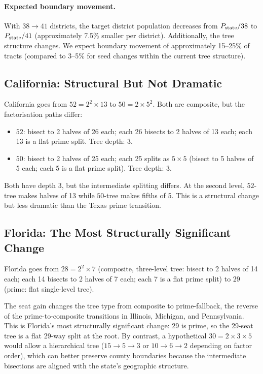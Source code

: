 \paragraph{Expected boundary movement.}
With $38 \to 41$ districts, the target district population decreases
from $P_{\rm state}/38$ to $P_{\rm state}/41$ (approximately 7.5\%
smaller per district).
Additionally, the tree structure changes.
We expect boundary movement of approximately 15--25\% of tracts
(compared to 3--5\% for seed changes within the current tree structure).

\subsection{California: Structural But Not Dramatic}

California goes from $52 = 2^2 \times 13$ to $50 = 2 \times 5^2$.
Both are composite, but the factorisation paths differ:
\begin{itemize}
\item $52$: bisect to 2 halves of 26 each; each 26 bisects to 2 halves of
      13 each; each 13 is a flat prime split.
      Tree depth: 3.
\item $50$: bisect to 2 halves of 25 each; each 25 splits as $5 \times 5$
      (bisect to 5 halves of 5 each; each 5 is a flat prime split).
      Tree depth: 3.
\end{itemize}

Both have depth 3, but the intermediate splitting differs.
At the second level, $52$-tree makes halves of 13 while $50$-tree makes
fifths of 5.
This is a structural change but less dramatic than the Texas prime transition.

\subsection{Florida: The Most Structurally Significant Change}

Florida goes from $28 = 2^2 \times 7$ (composite, three-level tree:
bisect to 2 halves of 14 each; each 14 bisects to 2 halves of 7 each;
each 7 is a flat prime split) to $29$ (prime: flat single-level tree).

The seat gain changes the tree type from composite to prime-fallback,
the reverse of the prime-to-composite transitions in Illinois, Michigan,
and Pennsylvania.
This is Florida's most structurally significant change: 29 is prime,
so the 29-seat tree is a flat 29-way split at the root.
By contrast, a hypothetical $30 = 2 \times 3 \times 5$ would allow a
hierarchical tree ($15 \to 5 \to 3$ or $10 \to 6 \to 2$ depending on
factor order), which can better preserve county boundaries because the
intermediate bisections are aligned with the state's geographic structure.

